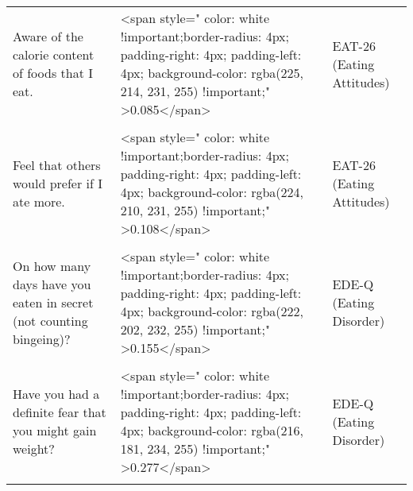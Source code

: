 \documentclass[border=1mm]{standalone}
\begin{document}
\begin{longtable}{lll}
Aware of the calorie content of foods that I eat. & <span style="     color: white !important;border-radius: 4px; padding-right: 4px; padding-left: 4px; background-color: rgba(225, 214, 231, 255) !important;" >0.085</span> & EAT-26 (Eating Attitudes)\\
\addlinespace
\cellcolor{gray!10}{Particularly avoid food with a high carbohydrate content (i.e. bread, rice, potatoes, etc.)} & \cellcolor{gray!10}{<span style="     color: white !important;border-radius: 4px; padding-right: 4px; padding-left: 4px; background-color: rgba(222, 202, 232, 255) !important;" >0.157</span>} & \cellcolor{gray!10}{EAT-26 (Eating Attitudes)}\\
Feel that others would prefer if I ate more. & <span style="     color: white !important;border-radius: 4px; padding-right: 4px; padding-left: 4px; background-color: rgba(224, 210, 231, 255) !important;" >0.108</span> & EAT-26 (Eating Attitudes)\\
\cellcolor{gray!10}{Vomit after I have eaten.} & \cellcolor{gray!10}{<span style="     color: white !important;border-radius: 4px; padding-right: 4px; padding-left: 4px; background-color: rgba(220, 194, 233, 255) !important;" >0.205</span>} & \cellcolor{gray!10}{EAT-26 (Eating Attitudes)}\\
On how many days have you eaten in secret (not counting bingeing)? & <span style="     color: white !important;border-radius: 4px; padding-right: 4px; padding-left: 4px; background-color: rgba(222, 202, 232, 255) !important;" >0.155</span> & EDE-Q (Eating Disorder)\\
\cellcolor{gray!10}{Have you been deliberately trying to limit the amount of food you eat to influence your shape or weight?} & \cellcolor{gray!10}{<span style="     color: white !important;border-radius: 4px; padding-right: 4px; padding-left: 4px; background-color: rgba(222, 202, 232, 255) !important;" >0.159</span>} & \cellcolor{gray!10}{EDE-Q (Eating Disorder)}\\
\addlinespace
Have you had a definite fear that you might gain weight? & <span style="     color: white !important;border-radius: 4px; padding-right: 4px; padding-left: 4px; background-color: rgba(216, 181, 234, 255) !important;" >0.277</span> & EDE-Q (Eating Disorder)\\
\cellcolor{gray!10}{Have you felt fat?} & \cellcolor{gray!10}{<span style="     color: white !important;border-radius: 4px; padding-right: 4px; padding-left: 4px; background-color: rgba(220, 196, 232, 255) !important;" >0.193</span>} & \cellcolor{gray!10}{EDE-Q (Eating Disorder)}\\

\end{longtable}
\end{document}

